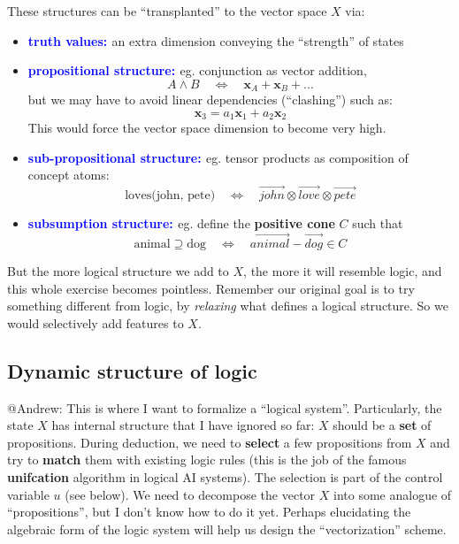 \documentclass[orivec]{llncs}
\newcommand{\emp}[1]{\textbf{\textcolor{blue}{#1}}}
\newcommand{\vect}[1]{\boldsymbol{#1}}
\begin{document}
These structures can be ``transplanted'' to the vector space $X$ via:
\begin{itemize}
\item \emp{truth values: } an extra dimension conveying the ``strength'' of states
\item \emp{propositional structure: } eg. conjunction as vector addition,
\begin{equation}
A \wedge B \quad \Leftrightarrow \quad \vect{x}_A + \vect{x}_B + ...
\end{equation}
but we may have to avoid linear dependencies (``clashing'') such as:
\begin{equation}
\vect{x}_3 = a_1 \vect{x}_1 + a_2 \vect{x}_2
\end{equation}
This would force the vector space dimension to become very high.
\item \emp{sub-propositional structure: } eg. tensor products as composition of concept atoms:
\begin{equation}
\mbox{loves(john, pete)} \quad \Leftrightarrow \quad \overrightarrow{john} \otimes \overrightarrow{love} \otimes \overrightarrow{pete}
\end{equation}
\item \emp{subsumption structure: } eg. define the \textbf{positive cone} $C$ such that
\begin{equation}
\mbox{animal} \supseteq \mbox{dog} \quad \Leftrightarrow \quad \overrightarrow{animal} - \overrightarrow{dog} \in C
\end{equation}
\end{itemize}

But the more logical structure we add to $X$, the more it will resemble logic, and this whole exercise becomes pointless.  Remember our original goal is to try something different from logic, by \textit{relaxing} what defines a logical structure.  So we would selectively add features to $X$.

\subsection{Dynamic structure of logic}

{\color{green}@Andrew: This is where I want to formalize a ``logical system''.  Particularly, the state $X$ has internal structure that I have ignored so far:  $X$ should be a \textbf{set} of propositions.  During deduction, we need to \textbf{select} a few propositions from $X$ and try to \textbf{match} them with existing logic rules (this is the job of the famous \textbf{unifcation} algorithm in logical AI systems).  The selection is part of the control variable $u$ (see below).  We need to decompose the vector $X$ into some analogue of ``propositions'', but I don't know how to do it yet.  Perhaps elucidating the algebraic form of the logic system will help us design the ``vectorization'' scheme.
}
\end{document}
